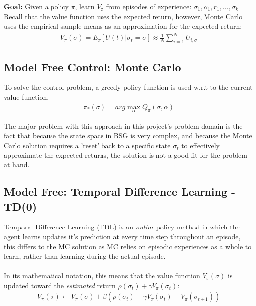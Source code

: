 \documentclass[ %
                    author={Ashwinder Khurana},
                supervisor={Prof Dave Cliff},
                    degree={MEng},
                     title={The Deeply Reinforced Trader},
                  subtitle={},
                      type={enterprise},
                      year={2020} ]{dissertation}
\begin{document}
{\noindent
\textbf{Goal: } Given a policy $\pi$, learn $V_\pi$ from episodes of experience: $\sigma_1, \alpha_1, r_1,..., \sigma_k$
Recall that the value function uses the expected return, however, Monte Carlo uses the empirical sample means as an approximation for the expected return:
\begin{equation}
\label{Monte Carlo Mean}
\begin{split}
V_\pi (\sigma) = E_\pi [U(t) | \sigma_t = \sigma] \approx \frac{1}{N} \sum\limits^{N}_{i=1}{U_{i,\sigma}}
\end{split}
\end{equation}
\noindent 

\subsection{Model Free Control: Monte Carlo}
To solve the control problem, a greedy policy function is used w.r.t to the current value function. 
\begin{equation}
\label{Monte Carlo Control}
\begin{split}
\pi_*(\sigma) = arg\max\limits^{}_{\alpha}{Q_\pi(\sigma,\alpha)}
\end{split}
\end{equation}

\noindent
The major problem with this approach in this project's problem domain is the fact that because the state space in BSG is very complex, and because the Monte Carlo solution requires a 'reset' back to a specific state ${\sigma_t}$ to effectively approximate the expected returns, the solution is not a good fit for the problem at hand. 

\subsection{Model Free: Temporal Difference Learning - TD(0)}
\label{TD learning}
Temporal Difference Learning (TDL) is an \textit{online}-policy method in which the agent learns updates it's prediction at every time step throughout an episode, this differs to the MC solution as MC relies on episodic experiences as a whole to learn, rather than learning during the actual episode.  
\\
\\
In its mathematical notation, this means that the value function $V_\pi(\sigma)$ is updated toward the \textit{estimated} return $\rho(\sigma_t) + \gamma V_\pi (\sigma_t)$:
\begin{equation}
\label{TD error}
\begin{split}
V_\pi(\sigma) \leftarrow V_\pi(\sigma) + \beta(\rho(\sigma_t) + \gamma V_\pi (\sigma_t) - V_\pi(\sigma_{t+1}))
\end{split}
\end{equation}

}
\end{document}
